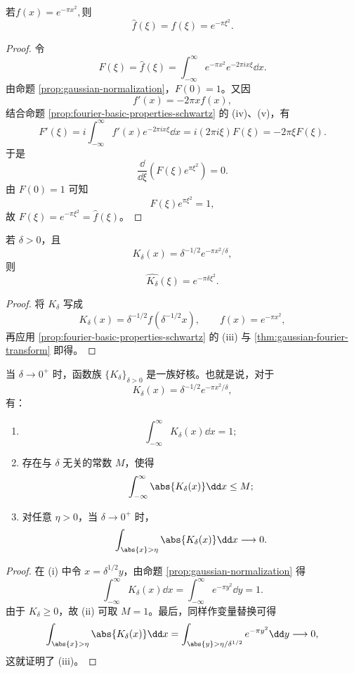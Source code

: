 \begin{proposition}\label{thm:gaussian-fourier-transform}
若$f(x)=e^{-\pi x^2},$则
\[
\widehat f(\xi)=f(\xi)=e^{-\pi\xi^2}.
\]
\end{proposition}

\begin{proof}
令
\[
F(\xi)=\widehat f(\xi)
=\int_{-\infty}^{\infty}e^{-\pi x^2}e^{-2\pi i x\xi}\dd x.
\]
由命题 \ref{prop:gaussian-normalization}，\(F(0)=1\)。又因
\[
f'(x)=-2\pi xf(x),
\]
结合命题 \ref{prop:fourier-basic-properties-schwartz} 的 (iv)、(v)，有
\[
F'(\xi)
=i\int_{-\infty}^{\infty}f'(x)e^{-2\pi i x\xi}\dd x
=i(2\pi i\xi)F(\xi)
=-2\pi\xi F(\xi).
\]
于是
\[
\frac{\dd}{\dd\xi}\left(F(\xi)e^{\pi\xi^2}\right)=0.
\]
由 \(F(0)=1\) 可知
\[
F(\xi)e^{\pi\xi^2}=1,
\]
故 \(F(\xi)=e^{-\pi\xi^2}=\widehat f(\xi)\)。
\end{proof}

\begin{corollary}\label{cor:scaled-gaussian-fourier-transform}
若 \(\delta>0\)，且
\[
K_\delta(x)=\delta^{-1/2}e^{-\pi x^2/\delta},
\]
则
\[
\widehat{K_\delta}(\xi)=e^{-\pi\delta\xi^2}.
\]
\end{corollary}

\begin{proof}
将 \(K_\delta\) 写成
\[
K_\delta(x)=\delta^{-1/2}f(\delta^{-1/2}x),
\qquad f(x)=e^{-\pi x^2},
\]
再应用 \ref{prop:fourier-basic-properties-schwartz} 的 (iii) 与 \ref{thm:gaussian-fourier-transform} 即得。
\end{proof}

\begin{theorem}\label{thm:gaussian-good-kernel}
当 \(\delta\to0^+\) 时，函数族 \(\{K_\delta\}_{\delta>0}\) 是一族好核。也就是说，对于
\[
K_\delta(x)=\delta^{-1/2}e^{-\pi x^2/\delta},
\]
有：
\begin{enumerate}[label=(\roman*)]
\item
\[
\int_{-\infty}^{\infty}K_\delta(x)\dd x=1;
\]

\item 存在与 \(\delta\) 无关的常数 \(M\)，使得
\[
\int_{-\infty}^{\infty}\abs{K_\delta(x)}\dd x\leq M;
\]

\item 对任意 \(\eta>0\)，当 \(\delta\to0^+\) 时，
\[
\int_{\abs{x}>\eta}\abs{K_\delta(x)}\dd x\longrightarrow0.
\]
\end{enumerate}
\end{theorem}

\begin{proof}
在 (i) 中令 \(x=\delta^{1/2}y\)，由命题 \ref{prop:gaussian-normalization} 得
\[
\int_{-\infty}^{\infty}K_\delta(x)\dd x
=\int_{-\infty}^{\infty}e^{-\pi y^2}\dd y=1.
\]
由于 \(K_\delta\geq0\)，故 (ii) 可取 \(M=1\)。最后，同样作变量替换可得
\[
\int_{\abs{x}>\eta}\abs{K_\delta(x)}\dd x
=\int_{\abs{y}>\eta/\delta^{1/2}}e^{-\pi y^2}\dd y
\longrightarrow0,
\]
这就证明了 (iii)。
\end{proof}

